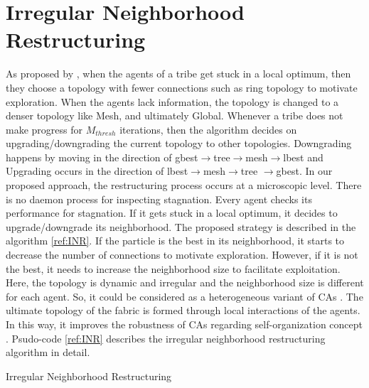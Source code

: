 \section{Irregular Neighborhood Restructuring}
As proposed by \cite{ali2016leveraged}, when the agents of a tribe get stuck in a local optimum, then they choose a topology with fewer connections such as ring topology to motivate exploration. When the agents lack information, the topology is changed to a denser topology like Mesh, and ultimately Global. Whenever a tribe does not make progress for $M_{thresh}$ iterations, then the algorithm decides on upgrading/downgrading the current topology to other topologies. Downgrading happens by moving in the direction of gbest$\rightarrow$tree$\rightarrow$mesh$\rightarrow$lbest and Upgrading occurs in the direction of lbest$\rightarrow$mesh$\rightarrow$tree $\rightarrow$gbest. In our proposed approach, the restructuring process occurs at a microscopic level. There is no daemon process for inspecting stagnation. Every agent checks its performance for stagnation. If it gets stuck in a local optimum, it decides to upgrade/downgrade its neighborhood. The proposed strategy is described in the algorithm \ref{ref:INR}. If the particle is the best in its neighborhood, it starts to decrease the number of connections to motivate exploration. However, if it is not the best, it needs to increase the neighborhood size to facilitate exploitation. Here, the topology is dynamic and irregular and the neighborhood size is different for each agent. So, it could be considered as a heterogeneous variant of CAs \cite{de2009heterogeneous}. The ultimate topology of the fabric is formed through local interactions of the agents. In this way, it improves the robustness of CAs regarding self-organization concept \cite{kennedy2001swarm}. Psudo-code \ref{ref:INR} describes the irregular neighborhood restructuring algorithm in detail.
\begin{algorithm}{	}
	\caption{Irregular Neighborhood Restructuring}			
\label{ref:INR}
\end{algorithm}

